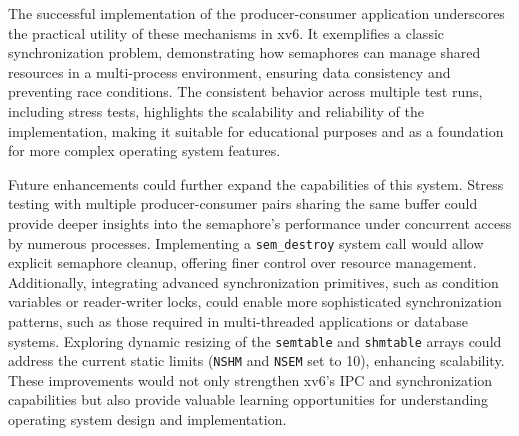\documentclass[12pt]{article}
\begin{document}
The successful implementation of the producer-consumer application underscores the practical utility of these mechanisms in xv6. It exemplifies a classic synchronization problem, demonstrating how semaphores can manage shared resources in a multi-process environment, ensuring data consistency and preventing race conditions. The consistent behavior across multiple test runs, including stress tests, highlights the scalability and reliability of the implementation, making it suitable for educational purposes and as a foundation for more complex operating system features.

Future enhancements could further expand the capabilities of this system. Stress testing with multiple producer-consumer pairs sharing the same buffer could provide deeper insights into the semaphore’s performance under concurrent access by numerous processes. Implementing a \texttt{sem\_destroy} system call would allow explicit semaphore cleanup, offering finer control over resource management. Additionally, integrating advanced synchronization primitives, such as condition variables or reader-writer locks, could enable more sophisticated synchronization patterns, such as those required in multi-threaded applications or database systems. Exploring dynamic resizing of the \texttt{semtable} and \texttt{shmtable} arrays could address the current static limits (\texttt{NSHM} and \texttt{NSEM} set to 10), enhancing scalability. These improvements would not only strengthen xv6’s IPC and synchronization capabilities but also provide valuable learning opportunities for understanding operating system design and implementation.
\end{document}
